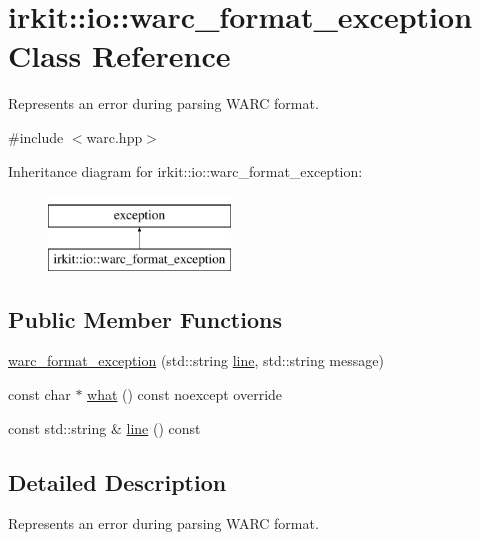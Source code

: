 \hypertarget{classirkit_1_1io_1_1warc__format__exception}{}\section{irkit\+:\+:io\+:\+:warc\+\_\+format\+\_\+exception Class Reference}
\label{classirkit_1_1io_1_1warc__format__exception}


Represents an error during parsing W\+A\+RC format.  




{\ttfamily \#include $<$warc.\+hpp$>$}

Inheritance diagram for irkit\+:\+:io\+:\+:warc\+\_\+format\+\_\+exception\+:\begin{figure}[H]
\begin{center}
\leavevmode
\includegraphics[height=2.000000cm]{classirkit_1_1io_1_1warc__format__exception}
\end{center}
\end{figure}
\subsection*{Public Member Functions}
\begin{DoxyCompactItemize}
\item 
\mbox{\hyperlink{classirkit_1_1io_1_1warc__format__exception_a2c328f2114bf1bba82e8a1b88b3bd6ce}{warc\+\_\+format\+\_\+exception}} (std\+::string \mbox{\hyperlink{classirkit_1_1io_1_1warc__format__exception_abf4c3f70a23e8b7b602db1ffa2c3b416}{line}}, std\+::string message)
\item 
const char $\ast$ \mbox{\hyperlink{classirkit_1_1io_1_1warc__format__exception_ad695c110c2550618c457929469adcb0a}{what}} () const noexcept override
\item 
const std\+::string \& \mbox{\hyperlink{classirkit_1_1io_1_1warc__format__exception_abf4c3f70a23e8b7b602db1ffa2c3b416}{line}} () const
\end{DoxyCompactItemize}


\subsection{Detailed Description}
Represents an error during parsing W\+A\+RC format. 

